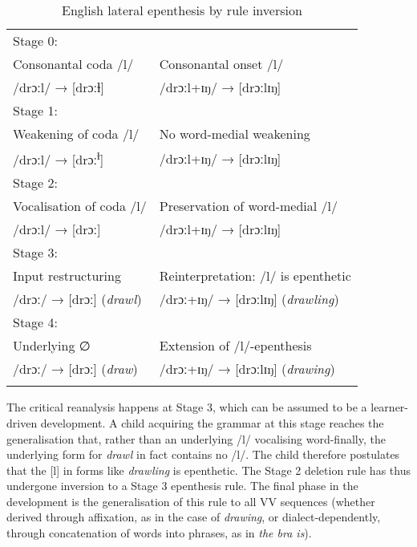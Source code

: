 \documentclass[output=paper,colorlinks,citecolor=brown]{langscibook}
\begin{document}
\begin{table}
\caption{English lateral epenthesis by rule inversion}
\label{eng_latep}
\begin{tabular}{ll}
\lsptoprule
Stage 0: & \\
\enspace Consonantal coda /l/ & Consonantal onset /l/ \\
\enspace /drɔːl/ → [drɔːɫ] & /drɔːl+ɪŋ/ → [drɔːlɪŋ] \\
    \midrule
Stage 1: & \\
\enspace Weakening of coda /l/ & No word-medial weakening \\
\enspace /drɔːl/ → [drɔː\textsuperscript{ɫ}] & /drɔːl+ɪŋ/ → [drɔːlɪŋ] \\
    \midrule
Stage 2: & \\
\enspace Vocalisation of coda /l/ & Preservation of word-medial /l/ \\
\enspace /drɔːl/ → [drɔː] & /drɔːl+ɪŋ/ → [drɔːlɪŋ] \\
    \midrule
Stage 3: & \\
\enspace Input restructuring & Reinterpretation: /l/ is epenthetic \\
\enspace /drɔː/ → [drɔː] (\textit{drawl}) & /drɔː+ɪŋ/ → [drɔːlɪŋ] (\textit{drawling}) \\
    \midrule
Stage 4: & \\
\enspace Underlying ∅ & Extension of /l/-epenthesis \\
\enspace /drɔː/ → [drɔː] (\textit{draw}) & /drɔː+ɪŋ/ → [drɔːlɪŋ] (\textit{drawing}) \\
\lspbottomrule
\end{tabular}
\end{table}


\newpage
The critical reanalysis happens at Stage 3, which can be assumed to be a learner-driven development.  A child acquiring the grammar at this stage reaches the generalisation that, rather than an underlying /l/ vocalising word-finally, the underlying form for \textit{drawl} in fact contains no /l/.  The child therefore postulates that the [l] in forms like \textit{drawling} is epenthetic.  The Stage 2 deletion rule has thus undergone inversion to a Stage 3 epenthesis rule.  The final phase in the development is the generalisation of this rule to all VV sequences (whether derived through affixation, as in the case of \textit{drawing}, or dialect-dependently, through concatenation of words into phrases, as in \textit{the bra is}).
\end{document}
